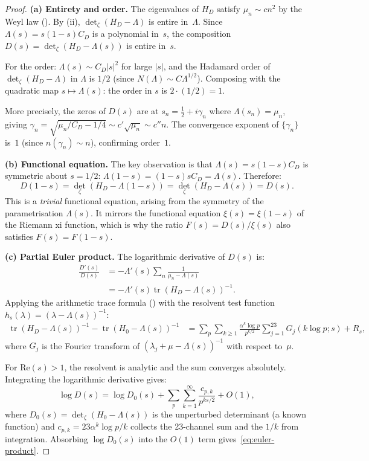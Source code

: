 \documentclass[11pt,a4paper]{article}
\theoremstyle{plain}
\theoremstyle{remark}
\DeclareMathOperator{\tr}{tr}
\begin{document}
\begin{proof}
\textbf{(a) Entirety and order.}
The eigenvalues of $H_D$ satisfy $\mu_n\sim cn^2$ by the Weyl law
().  By (ii), $\det_\zeta(H_D-\Lambda)$
is entire in~$\Lambda$.  Since $\Lambda(s)=s(1-s)C_D$ is a polynomial
in~$s$, the composition $D(s)=\det_\zeta(H_D-\Lambda(s))$ is entire in~$s$.

For the order: $\Lambda(s)\sim C_D|s|^2$ for large $|s|$, and the
Hadamard order of $\det_\zeta(H_D-\Lambda)$ in $\Lambda$ is $1/2$
(since $N(\Lambda)\sim C\Lambda^{1/2}$).  Composing with the quadratic
map $s\mapsto\Lambda(s)$: the order in $s$ is $2\cdot(1/2)=1$.

More precisely, the zeros of $D(s)$ are at $s_n=\frac{1}{2}+i\gamma_n$
where $\Lambda(s_n)=\mu_n$, giving
$\gamma_n=\sqrt{\mu_n/C_D-1/4}\sim c'\sqrt{\mu_n}\sim c''n$.
The convergence exponent of $\{\gamma_n\}$ is~$1$ (since $n(\gamma_n)\sim n$),
confirming order~$1$.

\textbf{(b) Functional equation.}
The key observation is that $\Lambda(s)=s(1-s)C_D$ is symmetric about
$s=1/2$: $\Lambda(1-s)=(1-s)sC_D=\Lambda(s)$.  Therefore:
\[
  D(1-s)=\det_\zeta(H_D-\Lambda(1-s))=\det_\zeta(H_D-\Lambda(s))=D(s).
\]
This is a \emph{trivial} functional equation, arising from the symmetry
of the parametrisation $\Lambda(s)$.  It mirrors the functional equation
$\xi(s)=\xi(1-s)$ of the Riemann xi function, which is why the ratio
$F(s)=D(s)/\xi(s)$ also satisfies $F(s)=F(1-s)$.

\textbf{(c) Partial Euler product.}
The logarithmic derivative of $D(s)$ is:
\begin{align*}
  \frac{D'(s)}{D(s)}
  &=-\Lambda'(s)\sum_n\frac{1}{\mu_n-\Lambda(s)}\\
  &=-\Lambda'(s)\tr(H_D-\Lambda(s))^{-1}.
\end{align*}
Applying the arithmetic trace formula () with the
resolvent test function $h_s(\lambda)=(\lambda-\Lambda(s))^{-1}$:
\begin{align*}
  \tr(H_D-\Lambda(s))^{-1}-\tr(H_0-\Lambda(s))^{-1}
  &=\sum_p\sum_{k\geq 1}\frac{\alpha^k\log p}{p^{k/2}}
  \sum_{j=1}^{23}G_j(k\log p;s)+R_s,
\end{align*}
where $G_j$ is the Fourier transform of $(\lambda_j+\mu-\Lambda(s))^{-1}$
with respect to~$\mu$.

For $\mathrm{Re}(s)>1$, the resolvent is analytic and the sum converges
absolutely.  Integrating the logarithmic derivative gives:
\[
  \log D(s)=\log D_0(s)+\sum_p\sum_{k=1}^\infty\frac{c_{p,k}}{p^{ks/2}}+O(1),
\]
where $D_0(s)=\det_\zeta(H_0-\Lambda(s))$ is the unperturbed determinant
(a known function) and $c_{p,k}=23\alpha^k\log p/k$ collects the
23-channel sum and the $1/k$ from integration.  Absorbing $\log D_0(s)$
into the $O(1)$ term gives~\eqref{eq:euler-product}.
\end{proof}
\end{document}
